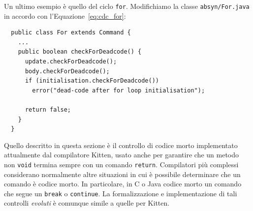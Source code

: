 Un ultimo esempio \`e quello del ciclo \texttt{for}.
Modifichiamo la classe \texttt{absyn/For.java} in accordo
con l'Equazione~\eqref{eq:cdc_for}:
%
\begin{verbatim}
  public class For extends Command {
    ...
    public boolean checkForDeadcode() {
      update.checkForDeadcode();
      body.checkForDeadcode();
      if (initialisation.checkForDeadcode())
        error("dead-code after for loop initialisation");

      return false;
    }
  }
\end{verbatim}
%

Quello descritto in questa sezione \`e il controllo di codice morto
implementato attualmente dal compilatore Kitten, usato anche per garantire che
un metodo non \texttt{void} termina sempre con un comando \texttt{return}.
Compilatori pi\`u complessi considerano normalmente altre situazioni in cui \`e
possibile determinare che un comando \`e codice morto. In particolare, in C o
Java \e codice morto un comando che segue un \texttt{break} o
\texttt{continue}.
La formalizzazione e implementazione di tali controlli \emph{evoluti}
\`e comunque simile a quelle per Kitten.
%
